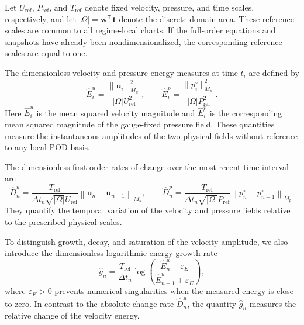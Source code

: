 Let $U_{\mathrm{ref}}$, $P_{\mathrm{ref}}$, and $T_{\mathrm{ref}}$ denote
fixed velocity, pressure, and time scales, respectively, and let
$|\Omega|=\boldsymbol{w}^{\mathsf T}\boldsymbol{1}$ denote the discrete
domain area.  These reference scales are common to all regime-local charts.
If the full-order equations and snapshots have already been
nondimensionalized, the corresponding reference scales are equal to one.

The dimensionless velocity and pressure energy measures at time $t_i$ are
defined by
\begin{equation}
  \widehat{E}^{u}_i
  =
  \frac{
    \|\boldsymbol{u}_i\|_{M_u}^{2}
  }{
    |\Omega|U_{\mathrm{ref}}^{2}
  },
  \qquad
  \widehat{E}^{p}_i
  =
  \frac{
    \|p_i^{\circ}\|_{M_p}^{2}
  }{
    |\Omega|P_{\mathrm{ref}}^{2}
  }.
  \label{eq:dimensionless_physical_energies}
\end{equation}
Here $\widehat{E}^{u}_i$ is the mean squared velocity magnitude and
$\widehat{E}^{p}_i$ is the corresponding mean squared magnitude of the
gauge-fixed pressure field.  These quantities measure the instantaneous
amplitudes of the two physical fields without reference to any local POD
basis.

The dimensionless first-order rates of change over the most recent time
interval are
\begin{equation}
  \widehat{D}^{u}_n
  =
  \frac{
    T_{\mathrm{ref}}
  }{
    \Delta t_n\sqrt{|\Omega|}U_{\mathrm{ref}}
  }
  \left\|
    \boldsymbol{u}_n-\boldsymbol{u}_{n-1}
  \right\|_{M_u},
  \qquad
  \widehat{D}^{p}_n
  =
  \frac{
    T_{\mathrm{ref}}
  }{
    \Delta t_n\sqrt{|\Omega|}P_{\mathrm{ref}}
  }
  \left\|
    p_n^{\circ}-p_{n-1}^{\circ}
  \right\|_{M_p}.
  \label{eq:dimensionless_physical_change_rates}
\end{equation}
They quantify the temporal variation of the velocity and pressure fields
relative to the prescribed physical scales.

To distinguish growth, decay, and saturation of the velocity amplitude, we
also introduce the dimensionless logarithmic energy-growth rate
\begin{equation}
  \widehat{g}_n
  =
  \frac{
    T_{\mathrm{ref}}
  }{
    \Delta t_n
  }
  \log
  \left(
    \frac{
      \widehat{E}^{u}_n+\varepsilon_E
    }{
      \widehat{E}^{u}_{n-1}+\varepsilon_E
    }
  \right),
  \label{eq:dimensionless_log_energy_growth}
\end{equation}
where $\varepsilon_E>0$ prevents numerical singularities when the measured
energy is close to zero.  In contrast to the absolute change rate
$\widehat{D}^{u}_n$, the quantity $\widehat{g}_n$ measures the relative
change of the velocity energy.

